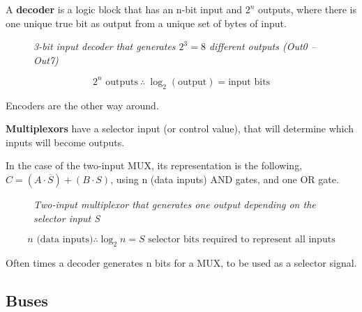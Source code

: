 \documentclass[11pt]{article}
\begin{document}
A \textbf{decoder} is a logic block that has an n-bit input and $2^n$ outputs, where there is one unique true bit as output from a unique set of bytes of input.

\begin{figure}[htbp]
    \centering
    \caption{\textit{3-bit input decoder that generates $2^3=8$ different outputs (Out0 – Out7)}}
\end{figure}

$$2^n \text{ outputs} \ \therefore \ \log_2{(\text{output})} = \text{input bits}$$

Encoders are the other way around.

\textbf{Multiplexors} have a selector input (or control value), that will determine which inputs will become outputs.

In the case of the two-input MUX, its representation is the following, $C=(A \cdot \overline{S}) +(B \cdot S)$, using n (data inputs) AND gates, and one OR gate.

\begin{figure}[htbp]
    \centering
    \caption{\textit{Two-input multiplexor that generates one output depending on the selector input S}}
\end{figure}

\vspace{-2.5em}
$$n \text{ (data inputs)} \therefore \log_2{n} = S \text{ selector bits required to represent all inputs}$$

Often times a decoder generates n bits for a MUX, to be used as a selector signal.

\subsection*{Buses}
\label{jmp:buses-general}
\end{document}
